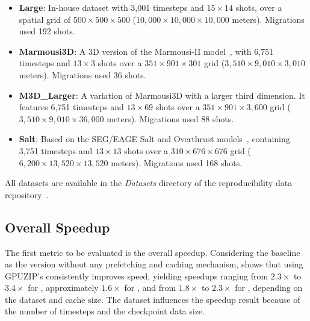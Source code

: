 \documentclass[Ingles,Final]{ic-tese-v3}
\begin{document}
\begin{itemize}
    \item \textbf{Large}: In-house dataset with 3,001 timesteps and $15 \times 14$ shots, over a spatial grid of $500 \times 500 \times 500$ ($10,000 \times 10,000 \times 10,000$ meters). Migrations used 192 shots.
    
    \item \textbf{Marmousi3D}: A 3D version of the Marmousi-II model~\cite{marmousi2}, with 6,751 timesteps and $13 \times 3$ shots over a $351 \times 901 \times 301$ grid ($3,510 \times 9,010 \times 3,010$ meters). Migrations used 36 shots.
    
    \item \textbf{M3D\_Larger}: A variation of Marmousi3D with a larger third dimension. It features 6,751 timesteps and $13 \times 69$ shots over a $351 \times 901 \times 3,600$ grid ($3,510 \times 9,010 \times 36,000$ meters). Migrations used 88 shots.
    
    \item \textbf{Salt}: Based on the SEG/EAGE Salt and Overthrust models~\cite{salt}, containing 3,751 timesteps and $13 \times 13$ shots over a $310 \times 676 \times 676$ grid ($6,200 \times 13,520 \times 13,520$ meters). Migrations used 168 shots.
\end{itemize}

All datasets are available in the \textit{Datasets} directory of the reproducibility data repository~\cite{ds}.

\subsection{Overall Speedup}
The first metric to be evaluated is the overall speedup. Considering the baseline as the version without any prefetching and caching mechanism,  shows that using GPUZIP's \checkpointprefetching consistently improves speed, yielding speedups ranging from $2.3\times$ to $3.4\times$ for \revolve, approximately $1.6\times$ for \zcut, and from $1.8\times$ to $2.3\times$ for \uniform, depending on the dataset and cache size. The dataset influences the speedup result because of the number of timesteps and the checkpoint data size.
\end{document}
